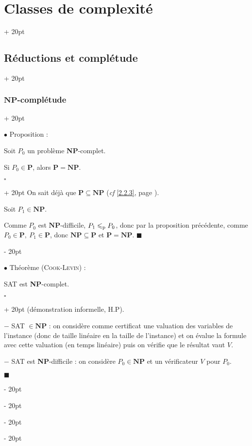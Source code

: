 \documentclass[a4paper, 12pt, twoside]{article}
\renewcommand{\le}{\leqslant}
\newcommand{\ind}[1][20pt]{\advance\leftskip + #1}
\newcommand{\deind}[1][20pt]{\advance\leftskip - #1}
\newenvironment{indt}[2][20pt]{#2 \par \ind[#1]}{\par \deind} %
\newenvironment{proof}[1][{}]{\begin{indt}{$\square$ #1}}{$\blacksquare$ \end{indt}}
\begin{document}
\begin{indt}{\section{Classes de complexité}}
\begin{indt}{\subsection{Réductions et complétude}}
\begin{indt}{\subsubsection{$\mathbf{NP}$-complétude}}
                \vspace{12pt}
                
                $\bullet$ Proposition :
                \begin{emphBox}
                    Soit $P_0$ un problème \textbf{NP}-complet.
                    
                    Si $P_0 \in \mathbf P$, alors $\mathbf P = \mathbf{NP}$.
                \end{emphBox}

                \vspace{6pt}
                
                \begin{proof}
                    On sait déjà que $\mathbf P \subseteq \mathbf{NP}$ (\textit{cf} \ref{2.2.3}, page \pageref{2.2.3}).

                    Soit $P_1 \in \mathbf{NP}$.

                    Comme $P_0$ est $\mathbf{NP}$-difficile, $P_1 \le_{\rm p} P_0$, donc par la proposition précédente, comme $P_0 \in \mathbf P,\ P_1 \in \mathbf P$, donc $\mathbf{NP} \subseteq \mathbf P$ et $\mathbf P = \mathbf{NP}$.
                \end{proof}

                \vspace{12pt}
                
                $\bullet$ Théorème (\textsc{Cook-Levin}) :
                \begin{emphBox}
                    SAT est \textbf{NP}-complet.
                \end{emphBox}

                \vspace{6pt}
                
                \begin{proof}
                    (démonstration informelle, H.P).

                    $-$ SAT $\in \mathbf{NP}$ : on considère comme certificat une valuation des variables de l'instance (donc de taille linéaire en la taille de l'instance) et on évalue la formule avec cette valuation (en temps linéaire) puis on vérifie que le résultat vaut $V$.

                    \vspace{6pt}
                    
                    $-$ SAT est \textbf{NP}-difficile : on considère $P_0 \in \mathbf{NP}$ et un vérificateur $V$ pour $P_0$.


\end{proof}
\end{indt}
\end{indt}
\end{indt}
\end{document}

